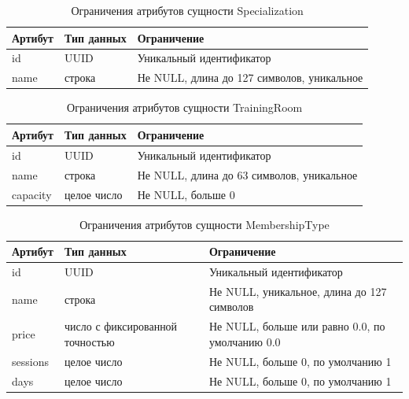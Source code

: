 \begin{table}[H]
	\centering
	\begin{tabular}{|p{3.5cm}|p{3.5cm}|p{8.5cm}|}
		\hline
		\textbf{Артибут}             & \textbf{Тип данных}   & \textbf{Ограничение}             \\ \hline
		id                            & UUID                 & Уникальный идентификатор         \\ \hline
		name                          & строка                 & Не NULL, длина до 127 символов, уникальное   \\ \hline
	\end{tabular}
	\caption{Ограничения атрибутов сущности Specialization}
\end{table}

\begin{table}[H]
	\centering
	\begin{tabular}{|p{3.5cm}|p{3.5cm}|p{8.5cm}|}
		\hline
		\textbf{Артибут}             & \textbf{Тип данных}   & \textbf{Ограничение}             \\ \hline
		id                            & UUID                  & Уникальный идентификатор         \\ \hline
		name                          & строка                 & Не NULL, длина до 63 символов, уникальное                         \\ \hline
		capacity                      & целое число              & Не NULL, больше 0                \\ \hline
	\end{tabular}
	\caption{Ограничения атрибутов сущности TrainingRoom}
\end{table}

\begin{table}[H]
	\centering
	\begin{tabular}{|p{2.5cm}|p{3.5cm}|p{9.5cm}|}
		\hline
		\textbf{Артибут}             & \textbf{Тип данных}   & \textbf{Ограничение}             \\ \hline
		id                            & UUID                 & Уникальный идентификатор         \\ \hline
		name                          & строка                 & Не NULL, уникальное,  длина до 127 символов   \\ \hline
		price                         & число с фиксированной точностью               & Не NULL, больше или равно 0.0, по умолчанию 0.0     \\ \hline
		sessions                      & целое число               & Не NULL, больше 0, по умолчанию 1              \\ \hline
		days                          & целое число              & Не NULL, больше 0, по умолчанию 1              \\ \hline
	\end{tabular}
	\caption{Ограничения атрибутов сущности MembershipType}
\end{table}

